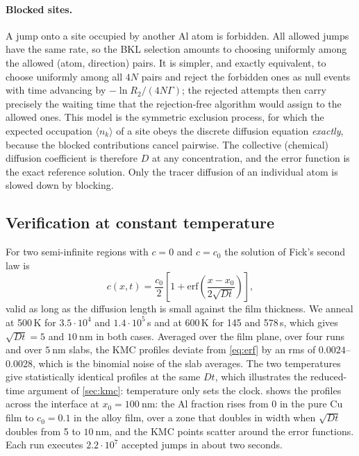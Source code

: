 \documentclass[11pt,a4paper]{article}
\numberwithin{equation}{section}
\theoremstyle{remark}
\begin{document}
\paragraph{Blocked sites.}
A jump onto a site occupied by another Al atom is forbidden. All allowed jumps have the same rate, so
the BKL selection amounts to choosing uniformly among the allowed (atom, direction) pairs. It is
simpler, and exactly equivalent, to choose uniformly among all $4N$ pairs and reject the forbidden ones
as null events with time advancing by $-\ln R_2/(4N\Gamma)$; the rejected attempts then carry precisely
the waiting time that the rejection-free algorithm would assign to the allowed ones. This model is the
symmetric exclusion process, for which the expected occupation $\langle n_k\rangle$ of a site obeys
the discrete diffusion equation \emph{exactly}, because the blocked contributions cancel pairwise. The
collective (chemical) diffusion coefficient is therefore $D$ at any concentration, and the error
function is the exact reference solution. Only the tracer diffusion of an individual atom is slowed
down by blocking.

\subsection{Verification at constant temperature}\label{sec:isothermal}

For two semi-infinite regions with $c = 0$ and $c = c_0$ the solution of Fick's second law is
\begin{equation}\label{eq:erf}
  c(x,t) = \frac{c_0}{2}\left[1 + \mathrm{erf}\!\left(\frac{x - x_0}{2\sqrt{Dt}}\right)\right],
\end{equation}
valid as long as the diffusion length is small against the film thickness. We anneal at 500\,K
for $3.5\cdot10^{4}$ and $1.4\cdot10^{5}$\,s and at 600\,K for 145 and 578\,s, which gives
$\sqrt{Dt} = 5$ and $\SI{10}{\nano\metre}$ in both cases. Averaged over the film plane, over four runs
and over $\SI{5}{\nano\metre}$ slabs, the KMC profiles deviate from \cref{eq:erf} by an rms of
$0.0024$--$0.0028$, which is the binomial noise of the slab averages. The two temperatures give
statistically identical profiles at the same $Dt$, which illustrates the reduced-time argument of
\cref{sec:kmc}: temperature only sets the clock.  shows the profiles across the
interface at $x_0 = \SI{100}{\nano\metre}$: the Al fraction rises from $0$ in the pure Cu film to
$c_0 = 0.1$ in the alloy film, over a zone that doubles in width when $\sqrt{Dt}$ doubles from 5 to
$\SI{10}{\nano\metre}$, and the KMC points scatter around the error functions. Each run executes
$2.2\cdot10^{7}$ accepted jumps in about two seconds.
\end{document}
